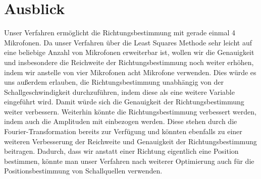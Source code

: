 \section{Ausblick}
Unser Verfahren ermöglicht die Richtungsbestimmung mit gerade einmal 4 Mikrofonen. Da unser Verfahren über die Least Squares Methode sehr leicht auf eine beliebige Anzahl von Mikrofonen erweiterbar ist, wollen wir die Genauigkeit und insbesondere die Reichweite der Richtungsbestimmung noch weiter erhöhen, indem wir anstelle von vier Mikrofonen acht Mikrofone verwenden. Dies würde es uns außerdem erlauben, die Richtungsbestimmung unabhängig von der Schallgeschwindigkeit durchzuführen, indem diese als eine weitere Variable eingeführt wird. Damit würde sich die Genauigkeit der Richtungsbestimmung weiter verbessern.
Weiterhin könnte die Richtungsbestimmung verbessert werden, indem auch die Amplituden mit einbezogen werden. Diese stehen durch die Fourier-Transformation bereits zur Verfügung und könnten ebenfalls zu einer weiteren Verbesserung der Reichweite und Genauigkeit der Richtungsbestimmung beitragen.
Dadurch, dass wir anstatt einer Richtung eigentlich eine Position bestimmen, könnte man unser Verfahren nach weiterer Optimierung auch für die Positionsbestimmung von Schallquellen verwenden.
